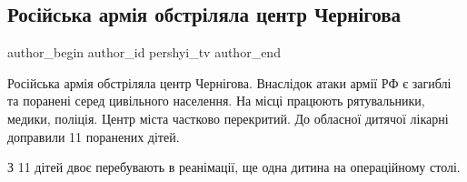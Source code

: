  
 
 
 
 

\subsection{Російська армія обстріляла центр Чернігова}
\label{sec:19_08_2023.fb.pershyi_tv.1.rosijska_armia_obstriljala_centr_chernigova}

\ifcmt
 author_begin
   author_id pershyi_tv
 author_end
\fi

Російська армія обстріляла центр Чернігова. Внаслідок атаки армії РФ є загиблі
та поранені серед цивільного населення. На місці працюють рятувальники, медики,
поліція. Центр міста частково перекритий. До обласної дитячої лікарні доправили
11 поранених дітей. 

З 11 дітей двоє перебувають в реанімації, ще одна дитина на операційному столі.
